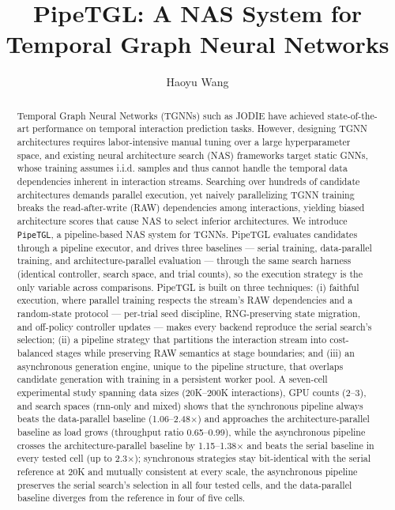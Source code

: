 \documentclass[sigconf, nonacm]{acmart}
\begin{document}
\title{PipeTGL: A NAS System for Temporal Graph Neural Networks}

\author{Haoyu Wang}

\begin{abstract}
  Temporal Graph Neural Networks (TGNNs) such as JODIE have achieved
  state-of-the-art performance on temporal interaction prediction tasks.
  However, designing TGNN architectures requires labor-intensive manual
  tuning over a large hyperparameter space, and existing neural
  architecture search (NAS) frameworks target static GNNs, whose training
  assumes i.i.d. samples and thus cannot handle the temporal data
  dependencies inherent in interaction streams. Searching over hundreds
  of candidate architectures demands parallel execution, yet naively
  parallelizing TGNN training breaks the read-after-write (RAW)
  dependencies among interactions, yielding biased
  architecture scores that cause NAS to select inferior architectures.
  We introduce \texttt{PipeTGL}, a pipeline-based NAS system for TGNNs.
  PipeTGL evaluates candidates through a pipeline executor, and drives
  three baselines --- serial training, data-parallel training, and
  architecture-parallel evaluation --- through the same search harness
  (identical controller, search space, and trial counts), so the
  execution strategy is the only variable across comparisons. PipeTGL is
  built on three techniques: (i) faithful execution, where parallel
  training respects the stream's RAW dependencies and a random-state
  protocol --- per-trial seed discipline, RNG-preserving state
  migration, and off-policy controller updates --- makes every backend
  reproduce the serial search's selection; (ii) a pipeline strategy
  that partitions the interaction stream into cost-balanced stages
  while preserving RAW semantics at stage boundaries; and (iii) an
  asynchronous generation engine, unique to the pipeline structure,
  that overlaps candidate generation with training in a persistent
  worker pool. A seven-cell experimental study spanning data sizes
  (20K--200K interactions), GPU counts (2--3), and search spaces
  (rnn-only and mixed) shows that the synchronous pipeline always beats
  the data-parallel baseline (1.06--2.48$\times$) and approaches the
  architecture-parallel baseline as load grows (throughput ratio
  0.65--0.99), while the asynchronous pipeline crosses the
  architecture-parallel baseline by 1.15--1.38$\times$ and beats the
  serial baseline in every tested cell (up to 2.3$\times$); synchronous
  strategies stay bit-identical with the serial reference at 20K and
  mutually consistent at every scale, the asynchronous pipeline
  preserves the serial search's selection in all four tested cells, and
  the data-parallel baseline diverges from the reference in four of
  five cells.
\end{abstract}
\end{document}
